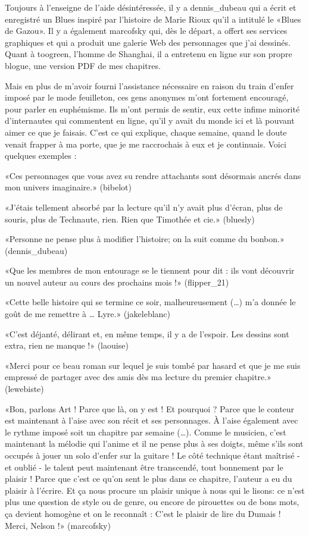 \begin{Postface}
Toujours à l’enseigne de l’aide désintéressée, il y a dennis_dubeau qui a écrit et enregistré un Blues inspiré par l’histoire de Marie Rioux qu’il a intitulé le «Blues de Gazou». Il y a également marcofsky qui, dès le départ, a offert ses services graphiques et qui a produit une galerie Web des personnages que j’ai dessinés. Quant à toogreen, l’homme de Shanghai, il a entretenu en ligne sur son propre blogue, une version PDF de mes chapitres.

Mais en plus de m’avoir fourni l’assistance nécessaire en raison du train d’enfer imposé par le mode feuilleton, ces gens anonymes m’ont fortement encouragé, pour parler en euphémisme. Ils m’ont permis de sentir, eux cette infime minorité d’internautes qui commentent en ligne, qu’il y avait du monde ici et là pouvant aimer ce que je faisais. C’est ce qui explique, chaque semaine, quand le doute venait frapper à ma porte, que je me raccrochais à eux et je continuais. Voici quelques exemples :

    «Ces personnages que vous avez su rendre attachants sont désormais ancrés dans mon univers imaginaire.» (bibelot)

    «J’étais tellement absorbé par la lecture qu’il n’y avait plus d’écran, plus de souris, plus de Technaute, rien. Rien que Timothée et cie.» (bluesly)

    «Personne ne pense plus à modifier l’histoire; on la suit comme du bonbon.» (dennis_dubeau)

    «Que les membres de mon entourage se le tiennent pour dit : ils vont découvrir un nouvel auteur au cours des prochains mois !» (flipper_21)

    «Cette belle histoire qui se termine ce soir, malheureusement (…) m’a donnée le goût de me remettre à … Lyre.» (jakeleblanc)

    «C’est déjanté, délirant et, en même temps, il y a de l’espoir. Les dessins sont extra, rien ne manque !» (laouise)

    «Merci pour ce beau roman sur lequel je suis tombé par hasard et que je me suis empressé de partager avec des amis dès ma lecture du premier chapitre.» (lewebiste)

    «Bon, parlons Art ! Parce que là, on y est ! Et pourquoi ? Parce que le conteur est maintenant à l’aise avec son récit et ses personnages. À l’aise également avec le rythme imposé soit un chapitre par semaine (…). Comme le musicien, c’est maintenant la mélodie qui l’anime et il ne pense plus à ses doigts, même s’ils sont occupés à jouer un solo d’enfer sur la guitare ! Le côté technique étant maîtrisé - et oublié - le talent peut maintenant être transcendé, tout bonnement par le plaisir ! Parce que c’est ce qu’on sent le plus dans ce chapitre, l’auteur a eu du plaisir à l’écrire. Et ça nous procure un plaisir unique à nous qui le lisons: ce n’est plus une question de style ou de genre, ou encore de pirouettes ou de bons mots, ça devient homogène et on le reconnaît : C’est le plaisir de lire du Dumais ! Merci, Nelson !» (marcofsky)


\end{Postface}
